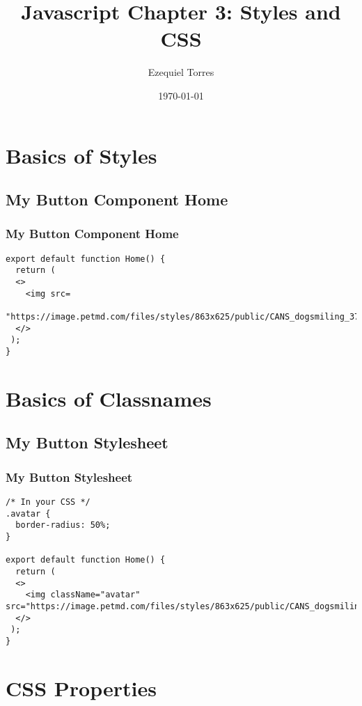 \documentclass{beamer}
\begin{document}
\title{Javascript Chapter 3: Styles and CSS}
\author{Ezequiel Torres}
\date{\today}
\frame{\titlepage}

\section{Basics of Styles}

\begin{frame}[fragile]
\subsection{My Button Component Home}
\frametitle{My Button Component Home}
\begin{lstlisting}
export default function Home() {
  return (
  <>
    <img src=
    "https://image.petmd.com/files/styles/863x625/public/CANS_dogsmiling_379727605.jpg"/>
  </>
 );
}
\end{lstlisting}
\end{frame}

\section{Basics of Classnames}

\begin{frame}[fragile]
\subsection{My Button Stylesheet}
\frametitle{My Button Stylesheet}
\begin{lstlisting}
/* In your CSS */
.avatar {
  border-radius: 50%;
}

export default function Home() {
  return (
  <>
    <img className="avatar" src="https://image.petmd.com/files/styles/863x625/public/CANS_dogsmiling_379727605.jpg"/>
  </>
 );
}
\end{lstlisting}
\end{frame}

\section{CSS Properties}
\end{document}
